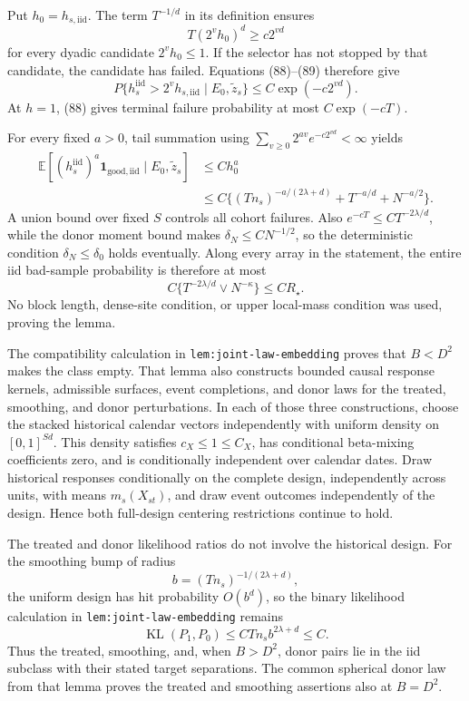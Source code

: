 Put \(h_0=h_{s,\mathrm{iid}}\).  The term \(T^{-1/d}\) in its definition ensures
\[
T(2^vh_0)^d\geq c2^{vd}
\tag{89}
\]
for every dyadic candidate \(2^vh_0\leq1\).  If the selector has not stopped by that candidate, the candidate has failed.  Equations (88)--(89) therefore give
\[
P\{h_s^{\mathrm{iid}}>2^vh_{s,\mathrm{iid}}\mid E_0,\widetilde z_s\}
\leq C\exp(-c2^{vd}).
\tag{90}
\]
At \(h=1\), (88) gives terminal failure probability at most \(C\exp(-cT)\).

For every fixed \(a>0\), tail summation using
\(\sum_{v\geq0}2^{av}e^{-c2^{vd}}<\infty\) yields
\[
\begin{aligned}
\mathbb E[(h_s^{\mathrm{iid}})^a\mathbf1_{\mathrm{good,iid}}
\mid E_0,\widetilde z_s]
&\leq Ch_0^a\\
&\leq C\{(Tn_s)^{-a/(2\lambda+d)}+T^{-a/d}+N^{-a/2}\}.
\end{aligned}
\tag{91}
\]
A union bound over fixed \(S\) controls all cohort failures.  Also
\(e^{-cT}\leq CT^{-2\lambda/d}\), while the donor moment bound makes \(\delta_N\leq CN^{-1/2}\), so the deterministic condition \(\delta_N\leq\delta_0\) holds eventually.  Along every array in the statement, the entire iid bad-sample probability is therefore at most
\[
C\{T^{-2\lambda/d}\vee N^{-\kappa}\}\leq CR_\star.
\tag{92}
\]
No block length, dense-site condition, or upper local-mass condition was used, proving the lemma.

The compatibility calculation in \texttt{lem:joint-law-embedding} proves that \(B<D^2\) makes the class empty.  That lemma also constructs bounded causal response kernels, admissible surfaces, event completions, and donor laws for the treated, smoothing, and donor perturbations.  In each of those three constructions, choose the stacked historical calendar vectors independently with uniform density on \([0,1]^{Sd}\).  This density satisfies \(c_X\leq1\leq C_X\), has conditional beta-mixing coefficients zero, and is conditionally independent over calendar dates.  Draw historical responses conditionally on the complete design, independently across units, with means \(m_s(X_{st})\), and draw event outcomes independently of the design.  Hence both full-design centering restrictions continue to hold.

The treated and donor likelihood ratios do not involve the historical design.  For the smoothing bump of radius
\[
b=(Tn_s)^{-1/(2\lambda+d)},
\]
the uniform design has hit probability \(O(b^d)\), so the binary likelihood calculation in \texttt{lem:joint-law-embedding} remains
\[
\operatorname{KL}(P_1,P_0)
\leq CTn_sb^{2\lambda+d}\leq C.
\tag{93}
\]
Thus the treated, smoothing, and, when \(B>D^2\), donor pairs lie in the iid subclass with their stated target separations.  The common spherical donor law from that lemma proves the treated and smoothing assertions also at \(B=D^2\).

